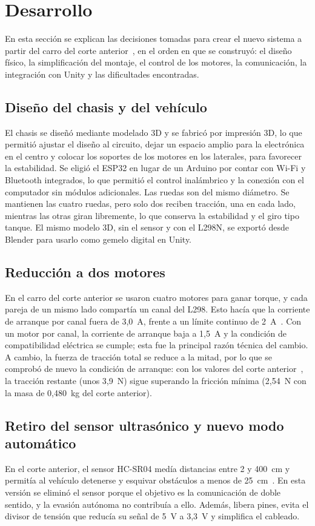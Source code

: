 \documentclass[journal]{IEEEtran}
\begin{document}
\section{Desarrollo}
En esta sección se explican las decisiones tomadas para crear el nuevo sistema a partir del carro del corte anterior~\cite{corte2}, en el orden en que se construyó: el diseño físico, la simplificación del montaje, el control de los motores, la comunicación, la integración con Unity y las dificultades encontradas.

\subsection{Diseño del chasis y del vehículo}
El chasis se diseñó mediante modelado 3D y se fabricó por impresión 3D, lo que permitió ajustar el diseño al circuito, dejar un espacio amplio para la electrónica en el centro y colocar los soportes de los motores en los laterales, para favorecer la estabilidad. Se eligió el ESP32 en lugar de un Arduino por contar con Wi-Fi y Bluetooth integrados, lo que permitió el control inalámbrico y la conexión con el computador sin módulos adicionales. Las ruedas son del mismo diámetro. Se mantienen las cuatro ruedas, pero solo dos reciben tracción, una en cada lado, mientras las otras giran libremente, lo que conserva la estabilidad y el giro tipo tanque. El mismo modelo 3D, sin el sensor y con el L298N, se exportó desde Blender para usarlo como gemelo digital en Unity.

\subsection{Reducción a dos motores}
En el carro del corte anterior se usaron cuatro motores para ganar torque, y cada pareja de un mismo lado compartía un canal del L298. Esto hacía que la corriente de arranque por canal fuera de 3,0~A, frente a un límite continuo de 2~A~\cite{corte2}. Con un motor por canal, la corriente de arranque baja a 1,5~A y la condición de compatibilidad eléctrica se cumple; esta fue la principal razón técnica del cambio. A cambio, la fuerza de tracción total se reduce a la mitad, por lo que se comprobó de nuevo la condición de arranque: con los valores del corte anterior~\cite{corte2}, la tracción restante (unos 3,9~N) sigue superando la fricción mínima (2,54~N con la masa de 0,480~kg del corte anterior).

\subsection{Retiro del sensor ultrasónico y nuevo modo automático}
En el corte anterior, el sensor HC-SR04 medía distancias entre 2 y 400~cm y permitía al vehículo detenerse y esquivar obstáculos a menos de 25~cm~\cite{corte2}. En esta versión se eliminó el sensor porque el objetivo es la comunicación de doble sentido, y la evasión autónoma no contribuía a ello. Además, libera pines, evita el divisor de tensión que reducía su señal de 5~V a 3,3~V y simplifica el cableado.
\end{document}
